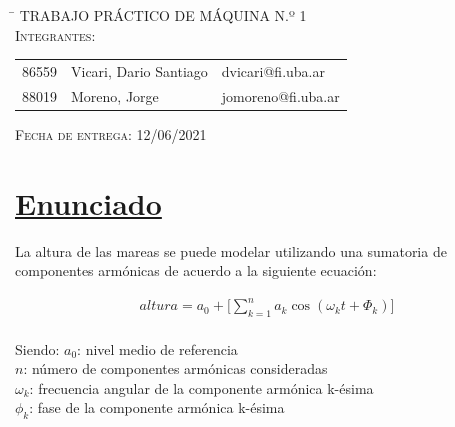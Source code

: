 \documentclass[10pt,a4paper]{article}
\numberwithin{equation}{section}
\numberwithin{figure}{section}
\numberwithin{table}{section}
\begin{document}
\begin{titlepage}
	\vspace*{5mm}

	\begin{large}
			
	\begin{tabbing}
		\hspace{15mm} \= \+	
		\textsc{TRABAJO PRÁCTICO DE MÁQUINA N.º 1}\\
		
         
		\textsc{Integrantes:}\\
	
	
		\begin{tabular}{ l l l }
			
          
			
            
             86559 & Vicari, Dario Santiago		&  dvicari@fi.uba.ar\\
             88019 & Moreno, Jorge              &  jomoreno@fi.uba.ar\\
             

		\end{tabular}
	 
	\end{tabbing}
	
	\end{large}
	
	\hspace{15mm} \textsc{Fecha de entrega:} 12/06/2021  	\hspace{15mm} 
	
\end{titlepage}


\setcounter{page}{1}


\section{\underline{Enunciado}}

La altura de las mareas se puede modelar utilizando una sumatoria de componentes armónicas de acuerdo a la siguiente ecuación:

\begin{equation}\label{eq_1}
    \begin{split}
        altura = a_0 + \Big[\sum_{k=1}^{n} a_k  \cos(\omega_k t + \Phi_k)\Big] 
    \end{split}
\end{equation}\\

Siendo:
$a_0$: nivel medio de referencia\\
$n$: número de componentes armónicas consideradas\\
$\omega_k$: frecuencia angular de la componente armónica k-ésima\\
$\phi_k$: fase de la componente armónica k-ésima\\
\end{document}
